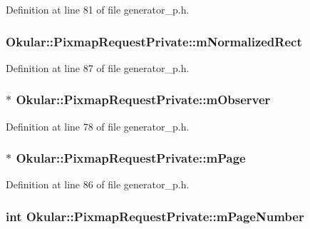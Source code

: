 Definition at line 81 of file generator\+\_\+p.\+h.

\hypertarget{classOkular_1_1PixmapRequestPrivate_af40ca30608338553a1be367fa0503e04}{
\subsubsection[{m\+Normalized\+Rect}]{ Okular\+::\+Pixmap\+Request\+Private\+::m\+Normalized\+Rect}}\label{classOkular_1_1PixmapRequestPrivate_af40ca30608338553a1be367fa0503e04}


Definition at line 87 of file generator\+\_\+p.\+h.

\hypertarget{classOkular_1_1PixmapRequestPrivate_acfdc694944c13c00f0c7dee73f440139}{
\subsubsection[{m\+Observer}]{$\ast$ Okular\+::\+Pixmap\+Request\+Private\+::m\+Observer}}\label{classOkular_1_1PixmapRequestPrivate_acfdc694944c13c00f0c7dee73f440139}


Definition at line 78 of file generator\+\_\+p.\+h.

\hypertarget{classOkular_1_1PixmapRequestPrivate_a8de6dea67745c17947f997857c77ed07}{
\subsubsection[{m\+Page}]{$\ast$ Okular\+::\+Pixmap\+Request\+Private\+::m\+Page}}\label{classOkular_1_1PixmapRequestPrivate_a8de6dea67745c17947f997857c77ed07}


Definition at line 86 of file generator\+\_\+p.\+h.

\hypertarget{classOkular_1_1PixmapRequestPrivate_a76f0197229b4a836b4bc75031cfa9b10}{
\subsubsection[{m\+Page\+Number}]{\setlength{\rightskip}{0pt plus 5cm}int Okular\+::\+Pixmap\+Request\+Private\+::m\+Page\+Number}}\label{classOkular_1_1PixmapRequestPrivate_a76f0197229b4a836b4bc75031cfa9b10}


